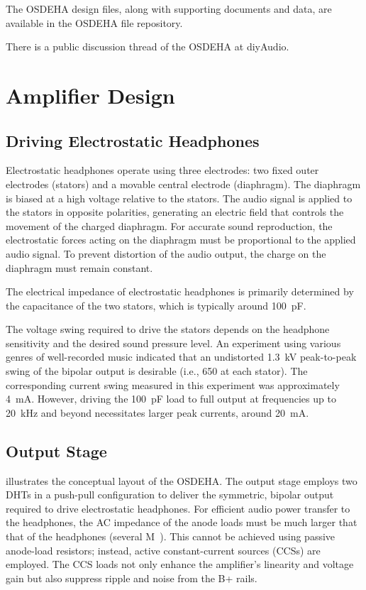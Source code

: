 The OSDEHA design files, along with supporting documents and data, are available in the OSDEHA file repository\cite{osdeha_github}.

There is a public discussion thread of the OSDEHA at diyAudio\cite{osdeha_p1}. 


\section{Amplifier Design}

\subsection{Driving Electrostatic Headphones} 

Electrostatic headphones operate using three electrodes: two fixed outer electrodes (stators) and a movable central electrode (diaphragm). The diaphragm is biased at a high voltage relative to the stators. The audio signal is applied to the stators in opposite polarities, generating an electric field that controls the movement of the charged diaphragm. For accurate sound reproduction, the electrostatic forces acting on the diaphragm must be proportional to the applied audio signal. To prevent distortion of the audio output, the charge on the diaphragm must remain constant.

The electrical impedance of electrostatic headphones is primarily determined by the capacitance of the two stators, which is typically around \SI{100}{pF}\cite{osdeha_p3}.

The voltage swing required to drive the stators depends on the headphone sensitivity and the desired sound pressure level. An experiment using various genres of well-recorded music indicated that an undistorted \SI{1.3}{kV} peak-to-peak swing of the bipolar output is desirable (i.e., \SI{650}{\unitVpp} at each stator)\cite{osdeha_p8}. The corresponding current swing measured in this experiment was approximately \SI{4}{mA}. However, driving the \SI{100}{pF} load to full output at frequencies up to \SI{20}{kHz} and beyond necessitates larger peak currents, around \SI{20}{mA}\cite{osdeha_p2}.


\subsection{Output Stage}

 illustrates the conceptual layout of the OSDEHA. The output stage employs two DHTs in a push-pull configuration to deliver the symmetric, bipolar output required to drive electrostatic headphones. For efficient audio power transfer to the headphones, the AC impedance of the anode loads must be much larger that that of the headphones (several \unit{M\Ohm}). This cannot be achieved using passive anode-load resistors; instead, active constant-current sources (CCSs) are employed. The CCS loads not only enhance the amplifier's linearity and voltage gain but also suppress ripple and noise from the B+ rails.

